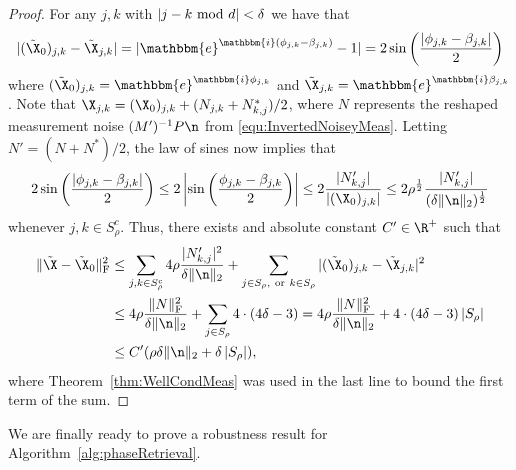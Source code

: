 \begin{proof}
For any $j,k$ with 
$| j - k ~{\rm mod}~d | < \delta$ we have that 
$$|(\tilde{\X}_0)_{j,k} - \tilde{\X}_{j,k}| = |\mathbbm{e}^{\mathbbm{i}(\phi_{j,k} - \beta_{j,k})} - 1| = 2 \sin \left(  \frac{| \phi_{j,k} - \beta_{j,k} |}{2} \right)$$
where $(\tilde{\X}_0)_{j,k} = \mathbbm{e}^{\mathbbm{i}\phi_{j,k}}$ and $\tilde{\X}_{j,k} = \mathbbm{e}^{\mathbbm{i}\beta_{j,k}}$.  Note that $\X_{j,k} = (\X_0)_{j,k} + (N_{j,k} + N_{k,j}^*) / 2$, where $N$ represents the reshaped measurement noise $(M')^{-1} P \n$ from \eqref{equ:InvertedNoiseyMeas}.  Letting $N' = (N + N^*) / 2$, the law of sines now implies that
$$2 \sin \left(  \frac{| \phi_{j,k} - \beta_{j,k} |}{2} \right) \leq 2 \left| \sin \left(  \frac{\phi_{j,k} - \beta_{j,k} }{2} \right) \right| \leq 2 \frac{|N'_{k,j}|}{| (\X_0)_{j,k} |} \leq 2 \rho^{\frac{1}{2}} \frac{|N'_{k,j}|}{(\delta \| \n \|_2)^{\frac{1}{2}}}$$
whenever $j,k \in S_\rho^{c}$.  Thus, there exists and absolute constant $C' \in \R^+$ such that
\begin{align*}
\| \tilde{\X} - \tilde{\X}_0 \|^2_{\rm F} &\leq \sum_{j,k \in S_\rho^{c}} 4 \rho \frac{|N'_{k,j}|^2}{\delta \| \n \|_2} + \sum_{j \in S_\rho, ~{\rm or}~ k \in S_\rho} |(\tilde{\X}_0)_{j,k} - \tilde{\X}_{j,k}|^2\\ &\leq 4 \rho \frac{\| N \|^2_{\rm F}}{\delta \| \n \|_2} + \sum_{j \in S_\rho} 4 \cdot (4\delta - 3) = 4 \rho \frac{\| N \|^2_{\rm F}}{\delta \| \n \|_2} + 4 \cdot (4\delta - 3) \left| S_\rho \right| \\ & \leq C' (\rho \delta \| \n \|_2 + \delta \left| S_\rho \right|),
\end{align*}
where Theorem~\ref{thm:WellCondMeas} was used in the last line to bound the first term of the sum.
\end{proof}

We are finally ready to prove a robustness result for Algorithm~\ref{alg:phaseRetrieval}.  

